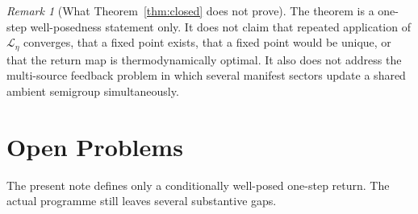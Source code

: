 \documentclass[12pt]{article}
\theoremstyle{definition}
\theoremstyle{remark}
\newtheorem{remark}[theorem]{Remark}
\begin{document}
\begin{remark}[What Theorem~\ref{thm:closed} does not prove]
The theorem is a one-step well-posedness statement only. It does not
claim that repeated application of \(\mathscr L_\eta\) converges, that a
fixed point exists, that a fixed point would be unique, or that the
return map is thermodynamically optimal. It also does not address the
multi-source feedback problem in which several manifest sectors update a
shared ambient semigroup simultaneously.
\end{remark}

\section{Open Problems}\label{sec:open}

The present note defines only a conditionally well-posed one-step return.
The actual programme still leaves several substantive gaps.
\end{document}
